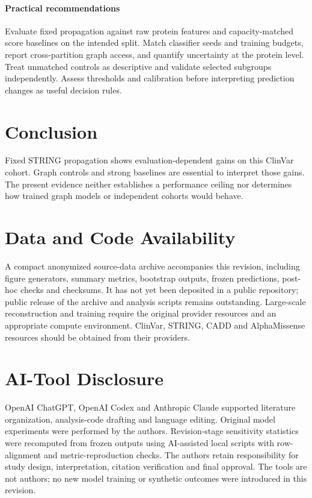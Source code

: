 \documentclass[conference]{IEEEtran}
\begin{document}
\paragraph{Practical recommendations}
Evaluate fixed propagation against raw protein features and capacity-matched score baselines on the intended split. Match classifier seeds and training budgets, report cross-partition graph access, and quantify uncertainty at the protein level. Treat unmatched controls as descriptive and validate selected subgroups independently. Assess thresholds and calibration before interpreting prediction changes as useful decision rules.

\section{Conclusion}
Fixed STRING propagation shows evaluation-dependent gains on this ClinVar cohort. Graph controls and strong baselines are essential to interpret those gains. The present evidence neither establishes a performance ceiling nor determines how trained graph models or independent cohorts would behave.

\section*{Data and Code Availability}

A compact anonymized source-data archive accompanies this revision, including figure generators, summary metrics, bootstrap outputs, frozen predictions, post-hoc checks and checksums. It has not yet been deposited in a public repository; public release of the archive and analysis scripts remains outstanding. Large-scale reconstruction and training require the original provider resources and an appropriate compute environment. ClinVar, STRING, CADD and AlphaMissense resources should be obtained from their providers.

\section*{AI-Tool Disclosure}

OpenAI ChatGPT, OpenAI Codex and Anthropic Claude supported literature organization, analysis-code drafting and language editing. Original model experiments were performed by the authors. Revision-stage sensitivity statistics were recomputed from frozen outputs using AI-assisted local scripts with row-alignment and metric-reproduction checks. The authors retain responsibility for study design, interpretation, citation verification and final approval. The tools are not authors; no new model training or synthetic outcomes were introduced in this revision.
\end{document}
